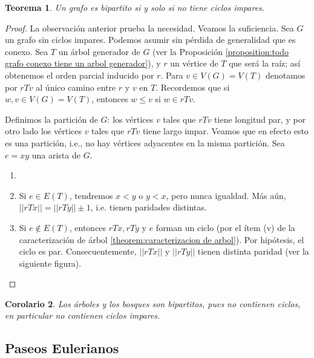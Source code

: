 \documentclass[12pt]{report}
\theoremstyle{plain}
\newtheorem{theorem}{Teorema}[section]
\newtheorem{corollary}[theorem]{Corolario}
\theoremstyle{definition}
\newenvironment{Theorem}{\colorlet{shadecolor}{OliveGreen!18} \begin{shaded} \begin{theorem}}{ \end{theorem} \end{shaded}}
\newcommand{\Abs}[1]{\left \vert \left \vert #1 \right \vert \right \vert}
\begin{document}
\begin{Theorem}
Un grafo es bipartito si y solo si no tiene ciclos impares.
\end{Theorem}
\begin{proof}
La observación anterior prueba la necesidad. Veamos la suficiencia. Sea $G$ un grafo sin ciclos impares. Podemos asumir sin pérdida de generalidad que es conexo. Sea $T$ un árbol generador de $G$ (ver la Proposición \ref{proposition:todo grafo conexo tiene un arbol generador}), y $r$ un vértice de $T$ que será la raíz; así obtenemos el orden parcial inducido por $r$. Para $v \in V(G) = V(T)$ denotamos por $rTv$ al único camino entre $r$ y $v$ en $T$. Recordemos que si $w,v \in V(G) = V(T)$, entonces $w \leq v$ si $w \in rTv$.

Definimos la partición de $G$: los vértices $v$ tales que $rTv$ tiene longitud par, y por otro lado los vértices $v$ tales que $rTv$ tiene largo impar. Veamos que en efecto esto es una partición, i.e., no hay vértices adyacentes en la misma partición. Sea $e = xy$ una arista de $G$.\vspace{-0.75cm}
\begin{enumerate}[leftmargin=1.80cm]
\item[]
\item[\textsc{Caso 1:}] Si $e \in E(T)$, tendremos $x < y$ o $y < x$, pero nunca igualdad. Más aún, $\Abs{rTx} = \Abs{rTy} \pm 1$, i.e. tienen paridades distintas.

\item[\textsc{Caso 2:}]  Si $e \not \in E(T)$, entonces $rTx, rTy$ y $e$ forman un ciclo (por el ítem (v) de la caracterización de árbol \ref{theorem:caracterizacion de arbol}). Por hipótesis, el ciclo es par. Consecuentemente, $\Abs{rTx}$ y $\Abs{rTy}$ tienen distinta paridad (ver la siguiente figura).
\end{enumerate}

\end{proof}

\begin{corollary}
Los árboles y los bosques son bipartitos, pues no contienen ciclos, en particular no contienen ciclos impares.
\end{corollary}


\subsection{Paseos Eulerianos}
\end{document}
